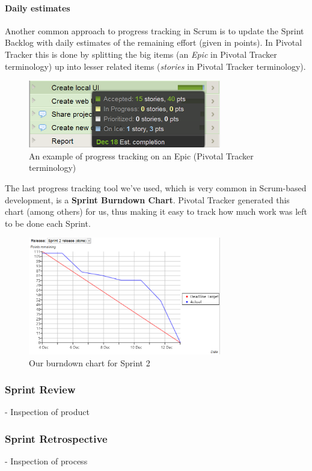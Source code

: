 \paragraph{Daily estimates}
Another common approach to progress tracking in Scrum is to update the Sprint Backlog with daily estimates of the remaining effort (given in points). In Pivotal Tracker this is done by splitting the big items (an \textit{Epic} in Pivotal Tracker terminology) up into lesser related items (\textit{stories} in Pivotal Tracker terminology).
\begin{figure}[htb]
	\centering
	\includegraphics[width=0.75\textwidth]{SCRUM/graphics/epic-example.png}
	\caption{An example of progress tracking on an Epic (Pivotal Tracker terminology)}
	\label{fig:epic-example}
\end{figure}

The last progress tracking tool we've used, which is very common in Scrum-based development, is a  \textbf{Sprint Burndown Chart}. Pivotal Tracker generated this chart (among others) for us, thus making it easy to track how much work was left to be done each Sprint.
\begin{figure}[htb]
	\centering
	\includegraphics[width=0.75\textwidth]{SCRUM/graphics/burndown-chart.png}
	\caption{Our burndown chart for Sprint 2}
	\label{fig:burndown-chart}
\end{figure}

\subsubsection{Sprint Review}
- Inspection of product

\subsubsection{Sprint Retrospective}
- Inspection of process